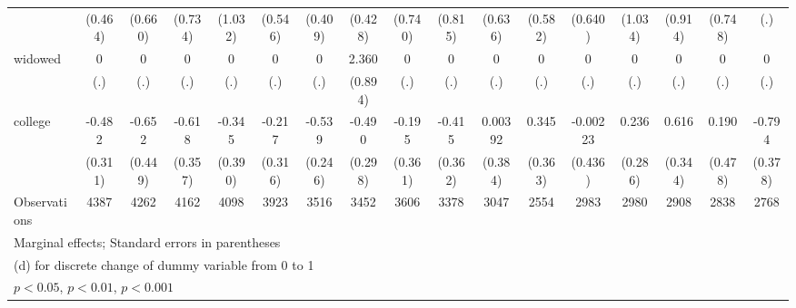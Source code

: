{\begin{tabular}{l*{16}{c}}
                    &     (0.464)         &     (0.660)         &     (0.734)         &     (1.032)         &     (0.546)         &     (0.409)         &     (0.428)         &     (0.740)         &     (0.815)         &     (0.636)         &     (0.582)         &     (0.640)         &     (1.034)         &     (0.914)         &     (0.748)         &         (.)         \\
[1em]
widowed             &           0         &           0         &           0         &           0         &           0         &           0         &       2.360\sym{**} &           0         &           0         &           0         &           0         &           0         &           0         &           0         &           0         &           0         \\
                    &         (.)         &         (.)         &         (.)         &         (.)         &         (.)         &         (.)         &     (0.894)         &         (.)         &         (.)         &         (.)         &         (.)         &         (.)         &         (.)         &         (.)         &         (.)         &         (.)         \\
[1em]
college             &      -0.482         &      -0.652         &      -0.618         &      -0.345         &      -0.217         &      -0.539\sym{*}  &      -0.490         &      -0.195         &      -0.415         &     0.00392         &       0.345         &    -0.00223         &       0.236         &       0.616         &       0.190         &      -0.794\sym{*}  \\
                    &     (0.311)         &     (0.449)         &     (0.357)         &     (0.390)         &     (0.316)         &     (0.246)         &     (0.298)         &     (0.361)         &     (0.362)         &     (0.384)         &     (0.363)         &     (0.436)         &     (0.286)         &     (0.344)         &     (0.478)         &     (0.378)         \\
\hline
Observations        &        4387         &        4262         &        4162         &        4098         &        3923         &        3516         &        3452         &        3606         &        3378         &        3047         &        2554         &        2983         &        2980         &        2908         &        2838         &        2768         \\
\hline\hline
\multicolumn{17}{l}{\footnotesize Marginal effects; Standard errors in parentheses}\\
\multicolumn{17}{l}{\footnotesize  (d) for discrete change of dummy variable from 0 to 1}\\
\multicolumn{17}{l}{\footnotesize \sym{*} \(p<0.05\), \sym{**} \(p<0.01\), \sym{***} \(p<0.001\)}\\
\end{tabular}
}
